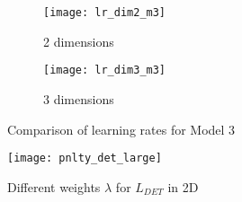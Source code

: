
\label{appendix}

\begin{figure}
	\centering
	\begin{subfigure}{.5\textwidth}
		\centering
		\texttt{[image: lr\_dim2\_m3]}
		\caption{2 dimensions}
	\end{subfigure}%
	\begin{subfigure}{.5\textwidth}
		\centering
		\texttt{[image: lr\_dim3\_m3]}
		\caption{3 dimensions}
	\end{subfigure}
	\caption{Comparison of learning rates for Model 3}
	\label{fig:comp_lr_m3}
\end{figure}

\begin{figure}[ht]
	\texttt{[image: pnlty\_det\_large]}
	\caption{Different weights $\lambda$ for $L_{DET}$ in 2D}
	\label{fig:pnlty_det_large}
\end{figure}


\clearpage

